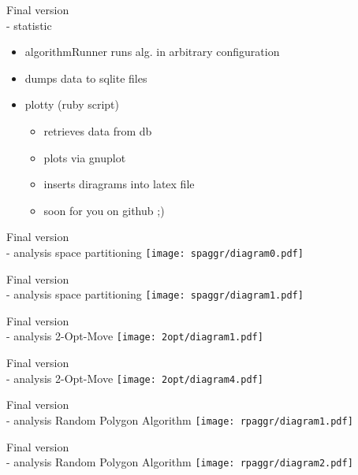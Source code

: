 \documentclass[ucs,9ptb]{beamer}
\begin{document}
\begin{frame}{Final version\\- statistic}
  \begin{itemize}
    \item algorithmRunner runs alg. in arbitrary configuration
    \item dumps data to sqlite files
    \item plotty (ruby script)
    \begin{itemize}
      \item retrieves data from db
      \item plots via gnuplot
      \item inserts diragrams into latex file
      \item soon for you on github  ;)
    \end{itemize}
  \end{itemize}
\end{frame}

\begin{frame}{Final version\\- analysis}
  space partitioning
  \texttt{[image: spaggr/diagram0.pdf]}
\end{frame}

\begin{frame}{Final version\\- analysis}
  space partitioning
  \texttt{[image: spaggr/diagram1.pdf]}
\end{frame}

\begin{frame}{Final version\\- analysis}
  2-Opt-Move
  \texttt{[image: 2opt/diagram1.pdf]}
\end{frame}

\begin{frame}{Final version\\- analysis}
  2-Opt-Move
  \texttt{[image: 2opt/diagram4.pdf]}
\end{frame}

\begin{frame}{Final version\\- analysis}
  Random Polygon Algorithm
  \texttt{[image: rpaggr/diagram1.pdf]}
\end{frame}

\begin{frame}{Final version\\- analysis}
  Random Polygon Algorithm
  \texttt{[image: rpaggr/diagram2.pdf]}
\end{frame}
\end{document}
